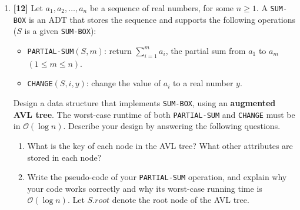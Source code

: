 \documentclass{assignment-263}
\begin{document}
\think
\begin{enumerate}
	\item \textbf{[12]} Let $a_1, a_2, \dots, a_n$ be a sequence of real
		numbers, for some $n \ge 1$.  A \texttt{SUM-BOX} is an ADT that
		stores the sequence and supports the following operations ($S$ is a
		given \texttt{SUM-BOX}):
		\begin{itemize}

			\item \texttt{PARTIAL-SUM}$(S, m)$: return $\sum_{i=1}^m a_i$,
				the partial sum from $a_1$ to $a_m$ $(1\le m\le n)$.

			\item \texttt{CHANGE}$(S, i, y)$: change the value of $a_i$ to a
				real number $y$.

		\end{itemize}
		Design a data structure that implements \texttt{SUM-BOX}, using an
		\textbf{augmented AVL tree}. The worst-case runtime of both
		\texttt{PARTIAL-SUM} and \texttt{CHANGE} must be in
		$\mathcal{O}(\log n)$. Describe your design by answering the
		following questions.
		\begin{enumerate}
			\item What is the key of each node in the AVL tree? What other
				attributes are stored in each node?

			\item Write the pseudo-code of your \texttt{PARTIAL-SUM}
				operation, and explain why your code works correctly and why
				its worst-case running time is $\mathcal{O}(\log n)$. Let
				$S.\textit{root}$ denote the root node of the AVL tree.


\end{enumerate}
\end{enumerate}
\end{document}
